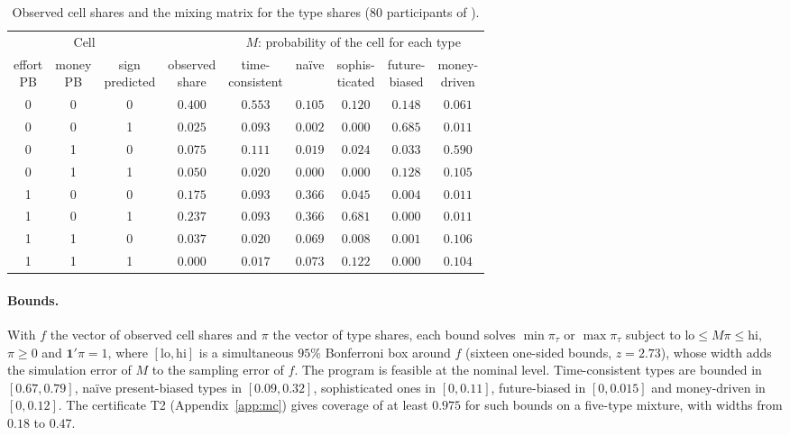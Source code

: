 \documentclass[11pt,a4paper]{article}
\theoremstyle{plain}
\theoremstyle{definition}
\begin{document}
\begin{table}[H]\centering
\caption{Observed cell shares and the mixing matrix for the type shares ($80$ participants of \citet{cerrone2026}).}
\label{tab:mixing}
{\footnotesize
\begin{tabular}{ccccccccc}
\toprule
\multicolumn{3}{c}{Cell} & & \multicolumn{5}{c}{$M$: probability of the cell for each type} \\
\cmidrule(lr){1-3}\cmidrule(lr){5-9}
\shortstack{effort\\PB} & \shortstack{money\\PB} & \shortstack{sign\\predicted} & \shortstack{observed\\share} &
\shortstack{time-\\consistent} & na\"ive & \shortstack{sophis-\\ticated} & \shortstack{future-\\biased} &
\shortstack{money-\\driven} \\
\midrule
0 & 0 & 0 & $0.400$ & $0.553$ & $0.105$ & $0.120$ & $0.148$ & $0.061$ \\
0 & 0 & 1 & $0.025$ & $0.093$ & $0.002$ & $0.000$ & $0.685$ & $0.011$ \\
0 & 1 & 0 & $0.075$ & $0.111$ & $0.019$ & $0.024$ & $0.033$ & $0.590$ \\
0 & 1 & 1 & $0.050$ & $0.020$ & $0.000$ & $0.000$ & $0.128$ & $0.105$ \\
1 & 0 & 0 & $0.175$ & $0.093$ & $0.366$ & $0.045$ & $0.004$ & $0.011$ \\
1 & 0 & 1 & $0.237$ & $0.093$ & $0.366$ & $0.681$ & $0.000$ & $0.011$ \\
1 & 1 & 0 & $0.037$ & $0.020$ & $0.069$ & $0.008$ & $0.001$ & $0.106$ \\
1 & 1 & 1 & $0.000$ & $0.017$ & $0.073$ & $0.122$ & $0.000$ & $0.104$ \\
\bottomrule
\end{tabular}}
\end{table}

\paragraph{Bounds.} With $f$ the vector of observed cell shares and $\pi$ the vector of type shares, each bound solves
$\min\pi_\tau$ or $\max\pi_\tau$ subject to $\mathrm{lo}\le M\pi\le\mathrm{hi}$, $\pi\ge0$ and $\mathbf 1'\pi=1$, where
$[\mathrm{lo},\mathrm{hi}]$ is a simultaneous $95\%$ Bonferroni box around $f$ (sixteen one-sided bounds, $z=2.73$),
whose width adds the simulation error of $M$ to the sampling error of $f$. The program is feasible at the nominal
level. Time-consistent types are bounded in $[0.67,0.79]$, na\"ive present-biased types in $[0.09,0.32]$,
sophisticated ones in $[0,0.11]$, future-biased in $[0,0.015]$ and money-driven in $[0,0.12]$. The certificate T2
(Appendix~\ref{app:mc}) gives coverage of at least $0.975$ for such bounds on a five-type mixture, with widths from
$0.18$ to $0.47$.
\end{document}
